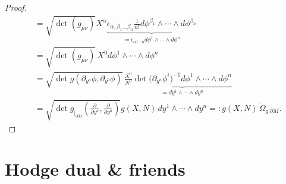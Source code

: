 \documentclass[../geometry_main.tex]{subfiles}
\begin{document}
\begin{proof}
{\begin{align}
    &= \sqrt{\det(g_{\mu \nu})} X^\alpha \underbrace{\epsilon_{\alpha,\beta_1\dots\beta_n}  \frac{1}{n!} d\phi^{\beta_1} \wedge \cdots \wedge d\phi^{\beta_n}}_{=\epsilon_{\alpha 1 \dots n} d\phi^1\wedge \cdots \wedge d\phi^n}\\
    &= \sqrt{\det(g_{\mu \nu})}\, X^0 d\phi^1\wedge \cdots \wedge d\phi^n\\
    &= \sqrt{\det g(\partial_{y^a} \phi, \partial_{y^b} \phi)}\, \frac{X^0}{N^0} \underbrace{\det\big(\partial_{y^a}\phi^i\big)^{-1} d\phi^1\wedge \cdots \wedge d\phi^n}_{=dy^1 \wedge \cdots \wedge dy^n}\\
    &= \sqrt{\det g_{|_{\partial M}}(\tfrac{\partial}{\partial y^a},\tfrac{\partial}{\partial y^a})} g(X,N) \, dy^1 \wedge \cdots \wedge dy^n =: g(X,N)\, \tilde{\Omega}_{g|\partial M}.
\end{align}
}
\end{proof}



\section{Hodge dual \& friends} 
\end{document}
